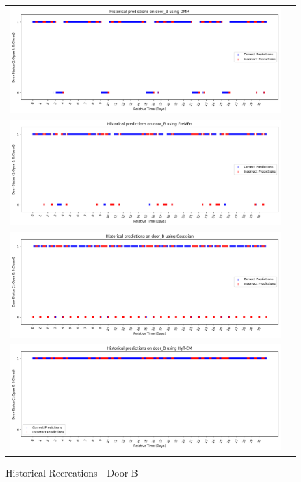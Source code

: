 \begin{center}
\begin{figure}[!Hp]
  \begin{tabular}{cc}
    {\includegraphics[width = 6in]{images/results/Historical_door_B_DMM.png}} \\
    {\includegraphics[width = 6in]{images/results/Historical_door_B_FreMEn.png}} \\
    {\includegraphics[width = 6in]{images/results/Historical_door_B_Gaussian.png}} \\
    {\includegraphics[width = 6in]{images/results/Historical_door_B_HyT-EM.png}} \\
  \end{tabular}
  \caption{Historical Recreations - Door B}
  \label{figure:historical_door_B}
\end{figure}\\ \\


\end{center}
